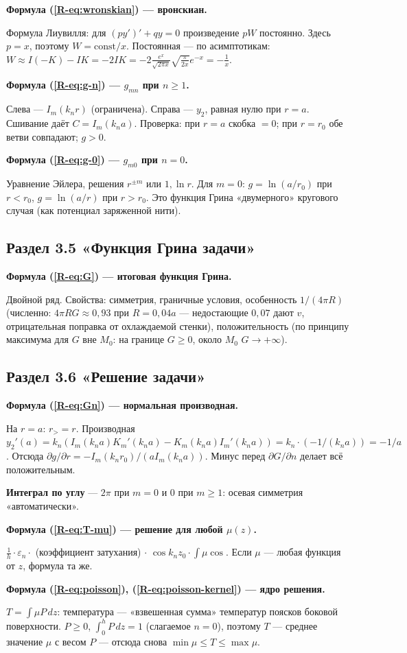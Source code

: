 \documentclass[a4paper,12pt]{article}
\renewcommand{\le}{\leqslant}
\renewcommand{\ge}{\geqslant}
\newcommand{\rf}[1]{(\ref*{R-#1})}
\newcommand{\fhead}[2]{\par\medskip\textbf{Формула #1 — #2.}\par\nopagebreak[4]}
\begin{document}
\fhead{\rf{eq:wronskian}}{вронскиан}
Формула Лиувилля: для $(py')'+qy=0$ произведение $pW$ постоянно. Здесь
$p=x$, поэтому $W=\text{const}/x$. Постоянная — по асимптотикам:
$W\approx I(-K)-IK=-2IK=-2\frac{e^x}{\sqrt{2\pi x}}\sqrt{\frac{\pi}{2x}}e^{-x}
=-\frac1x$.

\fhead{\rf{eq:g-n}}{$g_{mn}$ при $n\ge1$}
Слева — $I_m(k_nr)$ (ограничена). Справа — $y_2$, равная нулю при $r=a$.
Сшивание даёт $C=I_m(k_na)$. Проверка: при $r=a$ скобка $=0$; при
$r=r_0$ обе ветви совпадают; $g>0$.

\fhead{\rf{eq:g-0}}{$g_{m0}$ при $n=0$}
Уравнение Эйлера, решения $r^{\pm m}$ или $1,\ln r$. Для $m=0$:
$g=\ln(a/r_0)$ при $r<r_0$, $g=\ln(a/r)$ при $r>r_0$. Это функция
Грина «двумерного» кругового случая (как потенциал заряженной нити).

\subsection{Раздел 3.5 «Функция Грина задачи»}

\fhead{\rf{eq:G}}{итоговая функция Грина}
Двойной ряд. Свойства: симметрия, граничные условия, особенность
$1/(4\pi R)$ (численно: $4\pi RG\approx0{,}93$ при $R=0{,}04a$ —
недостающие $0{,}07$ дают $v$, отрицательная поправка от охлаждаемой
стенки), положительность (по принципу максимума для $G$ вне $M_0$:
на границе $G\ge0$, около $M_0$ $G\to+\infty$).

\subsection{Раздел 3.6 «Решение задачи»}

\fhead{\rf{eq:Gn}}{нормальная производная}
На $r=a$: $r_>=r$. Производная $y_2'(a)=k_n(I_m(k_na)K_m'(k_na)
-K_m(k_na)I_m'(k_na))=k_n\cdot(-1/(k_na))=-1/a$. Отсюда
$\partial g/\partial r=-I_m(k_nr_0)/(aI_m(k_na))$. Минус перед
$\partial G/\partial n$ делает всё положительным.

\textbf{Интеграл по углу} — $2\pi$ при $m=0$ и 0 при $m\ge1$: осевая
симметрия «автоматически».

\fhead{\rf{eq:T-mu}}{решение для любой $\mu(z)$}
$\frac{1}{h}\cdot\varepsilon_n\cdot$ (коэффициент затухания) $\cdot$
$\cos k_nz_0\cdot\int\mu\cos$. Если $\mu$ — любая функция от $z$,
формула та же.

\fhead{\rf{eq:poisson}, \rf{eq:poisson-kernel}}{ядро решения}
$T=\int\mu P\,dz$: температура — «взвешенная сумма» температур поясков
боковой поверхности. $P\ge0$, $\int_0^hP\,dz=1$ (слагаемое $n=0$), поэтому
$T$ — среднее значение $\mu$ с весом $P$ — отсюда снова
$\min\mu\le T\le\max\mu$.
\end{document}
